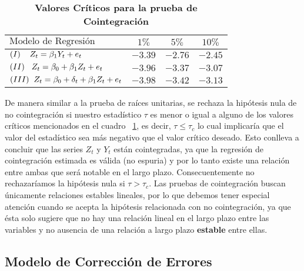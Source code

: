\begin{table}[ht]
\caption{\textbf{Valores Críticos para la prueba de Cointegración}}
\label{table:CVC}
\centering
   \begin{tabular}{lccc}
    \firsthline
    $\mbox{Modelo de Regresión}$                                               &  $1\%$    &  $5\%$    & $10\%$   \\
   \hline
    $(I) \hspace{4mm}Z_t =\beta_1 Y_{t} + e_t$                     		&  $-3.39$ 	&	 $-2.76$ 	& 	$-2.45$ \\
    $(II) \hspace{3mm}Z_t = \beta_0 + \beta_1Z_{t} + e_t$            	&  $-3.96$ 	& 	$-3.37$ 	& 	$-3.07$ \\
    $(III)\hspace{2mm} Z_t = \beta_0 + \delta_t + \beta_1Z_{t}  + e_t$ 	& $-3.98$ 	& 	$-3.42$ 	&	 $-3.13$ \\
    \hline
    \end{tabular}
\end{table}
 
 \bigskip


De manera similar a la prueba de raíces unitarias, se rechaza la hipótesis nula de no cointegración si nuestro estadístico $\tau$ es menor 
o igual a alguno de los valores críticos mencionados en el cuadro ~\ref{table:CVC}, es decir, $\tau \leq \tau_c$ lo cual implicaría que el valor del estadístico sea más negativo que el valor crítico deseado. Esto conlleva a concluir que las series $Z_t$ y $Y_t$ están cointegradas, ya que la regresión de cointegración estimada es válida (no espuria) y por lo tanto existe una relación entre ambas que será notable en el largo plazo.  Consecuentemente no rechazaríamos la hipótesis nula si $\tau > \tau_c$. Las pruebas de cointegración buscan únicamente relaciones estables lineales, por lo que debemos tener especial atención cuando se acepta la hipótesis relacionada con no cointegración, ya que ésta solo sugiere que no hay una relación lineal en el largo plazo entre las variables y no ausencia de una relación a largo plazo \textbf{estable} entre ellas.\bigskip


\subsection{Modelo de Corrección de Errores}



